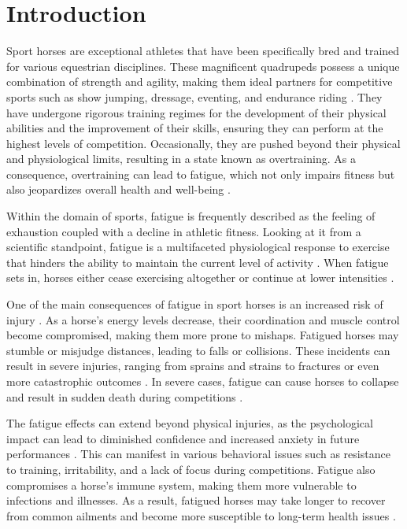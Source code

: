 \section{Introduction}
\label{sec:intro_introduction}

Sport horses are exceptional athletes that have been specifically bred and trained for various equestrian disciplines. These magnificent quadrupeds possess a unique combination of strength and agility, making them ideal partners for competitive sports such as show jumping, dressage, eventing, and endurance riding \cite{BARTOLOME}. They have undergone rigorous training regimes for the development of their physical abilities and the improvement of their skills, ensuring they can perform at the highest levels of competition. Occasionally, they are pushed beyond their physical and physiological limits, resulting in a  state known as overtraining. As a consequence, overtraining can lead to fatigue, which not only impairs fitness but also jeopardizes overall health and well-being \cite{takahashi2004}. 

Within the domain of sports, fatigue is frequently described as the feeling of exhaustion coupled with a decline in athletic fitness. Looking at it from a scientific standpoint, fatigue is a multifaceted physiological response to exercise that hinders the ability to maintain the current level of activity \cite{MAMI201974}. When fatigue sets in, horses either cease exercising altogether or continue at lower intensities \cite{GERARD201419}.  

One of the main consequences of fatigue in sport horses is an increased risk of injury \cite{yoshikawa}. As a horse's energy levels decrease, their coordination and muscle control become compromised, making them more prone to mishaps. Fatigued horses may stumble or misjudge distances, leading to falls or collisions. These incidents can result in severe injuries, ranging from sprains and strains to fractures or even more catastrophic outcomes \cite{MAMI201974}. In severe cases, fatigue can cause horses to collapse and result in sudden death during competitions \cite{verheyenarticle}.

The fatigue effects can extend beyond physical injuries, as the psychological impact can lead to diminished confidence and increased anxiety in future performances \cite{BARTOLOME}. This can manifest in various behavioral issues such as resistance to training, irritability, and a lack of focus during competitions. Fatigue also compromises a horse's immune system, making them more vulnerable to infections and illnesses. As a result, fatigued horses may take longer to recover from common ailments and become more susceptible to long-term health issues \cite{MAMI201974}.

